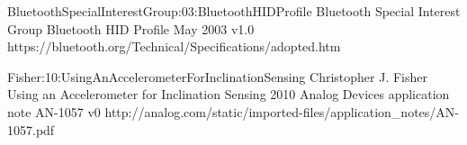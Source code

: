 
%
%
%
%
%
%

\newcommand{\urlEqual}{=}


\newdocref
    {BluetoothSpecialInterestGroup:03:BluetoothHIDProfile}
    {{Bluetooth Special Interest Group}}
    {Bluetooth HID Profile}
    {May}
    {2003}
    {v1.0}
    {https://bluetooth.org/Technical/Specifications/adopted.htm}

\newdocref
    {Fisher:10:UsingAnAccelerometerForInclinationSensing}
    {Christopher J. Fisher}
    {Using an Accelerometer for Inclination Sensing}
    {}
    {2010}
    {Analog Devices application note AN-1057 v0}
    {http://analog.com/static/imported-files/application_notes/AN-1057.pdf}

